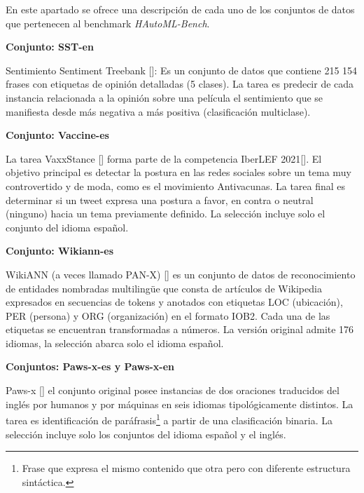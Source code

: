 \begin{annexes}\label{chapter:annexes}
   
En este apartado se ofrece una descripción de cada uno de los conjuntos de datos que pertenecen al benchmark \textit{HAutoML-Bench}.

\begin{flushleft} 
    { \textbf{Conjunto: SST-en}}\label{description:sst-en}
\end{flushleft}

Sentimiento Sentiment Treebank [\cite{sst}]: Es un conjunto de datos que contiene 215 154 frases con etiquetas de opinión detalladas (5 clases). 
La tarea es predecir de cada instancia relacionada a la opinión sobre una película el sentimiento que se manifiesta desde más negativa a más positiva 
(clasificación multiclase).

\begin{flushleft} 
    { \textbf{Conjunto: Vaccine-es}}\label{description:vaccine}
\end{flushleft}

La tarea VaxxStance [\cite{VaxxStance}] forma parte de la competencia IberLEF 2021[\cite{iberlef2021}]. El objetivo principal es detectar la postura en las redes 
sociales sobre un tema muy controvertido y de moda, como es el movimiento Antivacunas. La tarea final es determinar si un tweet expresa una postura a favor, 
en contra o neutral (ninguno) hacia un tema previamente definido. La selección incluye solo el conjunto del idioma español. 


\begin{flushleft} 
    { \textbf{Conjunto: Wikiann-es}}\label{description:wikkian}
\end{flushleft}

WikiANN (a veces llamado PAN-X) [\cite{wikkian}] es un conjunto de datos de reconocimiento de entidades nombradas multilingüe que consta de artículos de Wikipedia 
expresados en secuencias de tokens y anotados con etiquetas LOC (ubicación), PER (persona) y ORG (organización) en el formato IOB2. Cada una de las etiquetas se 
encuentran transformadas a números. 
La versión original admite 176 idiomas, la selección abarca solo el idioma español.  

\begin{flushleft} 
    { \textbf{Conjuntos: Paws-x-es y Paws-x-en}}\label{description:paws}
\end{flushleft}

Paws-x [\cite{paws-x}] el conjunto original posee instancias de dos oraciones traducidos del inglés por humanos y por máquinas en seis idiomas tipológicamente distintos. La tarea es 
identificación de paráfrasis\footnote{Frase que expresa el mismo contenido que otra pero con diferente estructura sintáctica.} a partir de una clasificación binaria. 
La selección incluye solo los conjuntos del idioma español y el inglés. 


\end{annexes}
